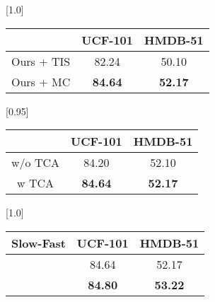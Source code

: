 \documentclass[10pt,twocolumn,letterpaper]{article}
\newcommand{\cmark}{\ding{51}}\newcommand{\xmark}{\ding{55}}\newcommand{\bx}{{\bm x}}
\begin{document}
\begin{table*}[t]
\begin{minipage}{.33\textwidth}
	\centering\small
	 \caption{\textbf{Temporal Sampling Strategy }. We compare our proposed temporal sampling strategy, motion correspondences (MC) (\cref{subsec:mo_pred}), against the alternate approach of temporal interval sampler (TIS) \cite{qian2020spatiotemporal} used with CNNs under contrastive settings. 
    }
	\setlength{\tabcolsep}{5pt}
	\scalebox{1.0}[1.0]{
	\begin{tabular}{c|c|c}
		\toprule
		\rowcolor{Gray}
		      & UCF-101     & HMDB-51  \\  \midrule
Ours + TIS \cite{qian2020spatiotemporal} & 82.24   & 50.10 \\ 
Ours + MC & \textbf{84.64}   & \textbf{52.17} \\ \bottomrule
	\end{tabular}}
\label{tbl:ablation_temporal_aug}
\end{minipage}
\hfill
\begin{minipage}{.30\textwidth}
	\centering\small
    \caption{\textbf{Augmentations}: Using temporally consistent augmentations (TCA) \cite{qian2020spatiotemporal} applied randomly over the spatial dimensions for different views result in consistent improvements on UCF-101 and HMDB-51 datasets. 
}
	\setlength{\tabcolsep}{5pt}
	\scalebox{0.95}[0.95]{
	\begin{tabular}{c|c|c}
		\toprule
		\rowcolor{Gray}
		          & UCF-101     & HMDB-51  \\  \midrule
		w/o  TCA \cite{qian2020spatiotemporal} & 84.20   & 52.10 \\
	    w TCA \cite{qian2020spatiotemporal}    & \textbf{84.64}   & \textbf{52.17} \\ \bottomrule
	\end{tabular}}
\label{tbl:ablation_aug}
\end{minipage}
\hfill
\begin{minipage}{.31\textwidth}
	\centering\small
    \caption{\textbf{Slow-Fast Inference}: Feeding multiple views of varying spatiotemporal resolutions to a single shared network (multi-view) results in clear performance gains over feeding single-views across both UCF-101 and HMDB-51 datasets.}
    \label{tbl:ablation_inf}
	\setlength{\tabcolsep}{5pt}
	\scalebox{1.0}[1.0]{
	\begin{tabular}{c|c|c}
		\toprule
		\rowcolor{Gray}
		Slow-Fast       & UCF-101     & HMDB-51  \\  \midrule
		\xmark      & 84.64   & 52.17 \\
		\cmark      & \textbf{84.80}   & \textbf{53.22} \\ \bottomrule
	\end{tabular}}
\end{minipage}
\end{table*}
\end{document}
